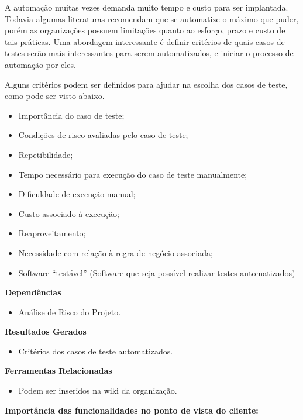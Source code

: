 A automação muitas vezes demanda muito tempo e custo para ser implantada. Todavia algumas literaturas recomendam que se automatize o máximo que puder, porém as organizações possuem limitações quanto ao esforço, prazo e custo de tais práticas. Uma abordagem interessante é definir critérios de quais casos de testes serão mais interessantes para serem automatizados, e iniciar o processo de automação por eles.

Alguns critérios podem ser definidos para ajudar na escolha dos casos de teste, como pode ser visto abaixo.

\begin{itemize}
    \item Importância do caso de teste;
    \item Condições de risco avaliadas pelo caso de teste;
    \item Repetibilidade;
    \item Tempo necessário para execução do caso de teste manualmente;
    \item Dificuldade de execução manual;
    \item Custo associado à execução;
    \item Reaproveitamento;
    \item Necessidade com relação à regra de negócio associada;
    \item Software “testável” (Software que seja possível realizar testes automatizados)
\end{itemize}

\textbf{ Dependências }
\begin{itemize}
    \item Análise de Risco do Projeto.
\end{itemize}

\textbf{ Resultados Gerados }
\begin{itemize}
    \item Critérios dos casos de teste automatizados.
\end{itemize}

\textbf{ Ferramentas Relacionadas }
\begin{itemize}
    \item Podem ser inseridos na wiki da organização.
\end{itemize}

\textbf{Importância das funcionalidades no ponto de vista do cliente:}

